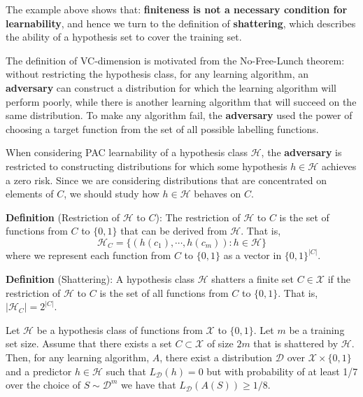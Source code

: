 \documentclass{article}
\begin{document}
The example above shows that: \textbf{finiteness is not a necessary condition for learnability}, and hence we turn to the definition of \textbf{shattering}, which describes the ability of a hypothesis set to cover the training set.

The definition of VC-dimension is motivated from the No-Free-Lunch theorem: without restricting the hypothesis class, for any learning algorithm, an \textbf{adversary} can construct a distribution for which the learning algorithm will perform poorly, while there is another learning algorithm that will succeed on the same distribution. To make any algorithm fail, the \textbf{adversary} used the power of choosing a target function from the set of all possible labelling functions.

When considering PAC learnability of a hypothesis class $\mathcal{H}$, the \textbf{adversary} is restricted to constructing distributions for which some hypothesis $h\in\mathcal{H}$ achieves a zero risk. Since we are considering distributions that are concentrated on elements of $C$, we should study how $h\in\mathcal{H}$ behaves on $C$.

\noindent\textbf{Definition} (Restriction of $\mathcal{H}$ to $C$): The restriction of $\mathcal{H}$ to $C$ is the set of functions from $C$ to $\{0,1\}$ that can be derived from $\mathcal{H}$. That is,
	\begin{equation}
	\mathcal{H}_C=\{(h(c_1),\cdots,h(c_m)):h\in\mathcal{H}\}
	\end{equation}
where we represent each function from $C$ to $\{0,1\}$ as a vector in $\{0,1\}^{|C|}$.

\noindent\textbf{Definition} (Shattering): A hypothesis class $\mathcal{H}$ shatters a finite set $C\in\mathcal{X}$ if the restriction of $\mathcal{H}$ to $C$ is the set of all functions from $C$ to $\{0,1\}$. That is, $|\mathcal{H}_C|=2^{|C|}$.

\begin{corollary*} Let $\mathcal{H}$ be a hypothesis class of functions from $\mathcal{X}$ to $\{0, 1\}$. Let $m$ be a training set size. Assume that there exists a set $C\subset\mathcal{X}$ of size $2m$ that is shattered by $\mathcal{H}$. Then, for any learning algorithm, $A$, there exist a distribution $\mathcal{D}$ over $\mathcal{X} \times \{0, 1\}$ and a predictor $h\in\mathcal{H}$ such that $L_{\mathcal{D}}(h) = 0$ but with probability of at least 1/7 over the choice of $S\sim\mathcal{D}^m$ we have that $L_\mathcal{D}(A(S))\geq 1/8$.
\end{corollary*}
\end{document}
